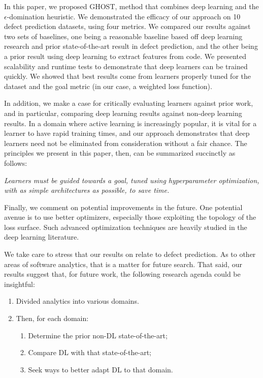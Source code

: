 \documentclass[10pt,compsoc,twocolumn]{IEEEtran}
\begin{document}
In this paper, we proposed GHOST, method that combines deep learning
and the $\epsilon$-domination heuristic.
 We demonstrated the efficacy of our approach on 10 defect prediction datasets, using four metrics. We compared our results against two sets of baselines, one being a reasonable baseline based off deep learning research and prior state-of-the-art result in defect prediction, and the other being a prior result using deep learning to extract features from code.  
 We presented scalability and runtime tests to demonstrate that deep learners can be trained quickly.
We showed that best results come from  learners properly tuned for the dataset and the goal metric (in our case, a weighted loss function). 


In addition, we make a case for critically evaluating learners against prior work, and in particular, comparing deep learning results against non-deep learning results. In a domain where active learning is increasingly popular, it is vital for a learner to have rapid training times, and our approach demonstrates that deep learners need not be eliminated from consideration without a fair chance. The principles we present in this paper, then, can be summarized succinctly as follows:

\begin{blockquote}
    \textit{Learners must be guided towards a goal, tuned using hyperparameter optimization, with as simple architectures as possible, to save time.}
\end{blockquote}

Finally, we comment on potential improvements in the future. One potential avenue is to use better optimizers, especially those exploiting the topology of the loss surface. Such advanced optimization techniques are heavily studied in the deep learning literature.
 
 We take  care to stress that our results on relate to defect prediction. As to other areas of software analytics, that is a matter for future search. That said,
our results suggest that, for future work, the following research agenda could be insightful:
 \begin{enumerate}
\item
 Divided analytics into various domains. 
 \item
 Then, for each domain:
 \begin{enumerate}\item
 Determine the prior non-DL state-of-the-art; \item Compare DL with that state-of-the-art; 
 \item Seek ways to better adapt DL to that domain.
 \end{enumerate}\end{enumerate} 
 
\end{document}
